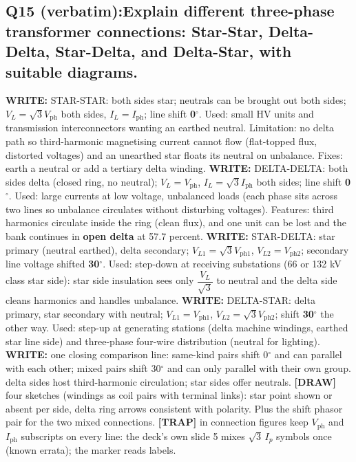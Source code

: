 \documentclass[11pt]{article}
\newcommand{\q}[2]{\subsection*{\color{copper}#1\quad\color{iron}#2}}
\newcommand{\w}[1]{\textbf{\color{copper}WRITE:} #1}
\newcommand{\tr}[1]{\textbf{\color{red}[TRAP]} #1}
\newcommand{\dw}[1]{\textbf{\color{muted}[DRAW]} #1}
\begin{document}
\q{Q15 (verbatim):}{Explain different three-phase transformer connections: Star-Star, Delta-Delta, Star-Delta, and Delta-Star, with suitable diagrams.}
\w{STAR-STAR:} both sides star; neutrals can be brought out both sides; $V_L = \sqrt{3} V_{\text{ph}}$ both sides, $I_L = I_{\text{ph}}$; line shift \textbf{0$^\circ$}. Used: small HV units and transmission interconnectors wanting an earthed neutral. Limitation: no delta path so third-harmonic magnetising current cannot flow (flat-topped flux, distorted voltages) and an unearthed star floats its neutral on unbalance. Fixes: earth a neutral or add a tertiary delta winding.
\w{DELTA-DELTA:} both sides delta (closed ring, no neutral); $V_L = V_{\text{ph}}$, $I_L = \sqrt{3} I_{\text{ph}}$ both sides; line shift \textbf{0$^\circ$}. Used: large currents at low voltage, unbalanced loads (each phase sits across two lines so unbalance circulates without disturbing voltages). Features: third harmonics circulate inside the ring (clean flux), and one unit can be lost and the bank continues in \textbf{open delta} at 57.7 percent.
\w{STAR-DELTA:} star primary (neutral earthed), delta secondary; $V_{L1} = \sqrt{3} V_{\text{ph1}}$, $V_{L2} = V_{\text{ph2}}$; secondary line voltage shifted \textbf{30$^\circ$}. Used: step-down at receiving substations (66 or 132 kV class star side): star side insulation sees only $\dfrac{V_L}{\sqrt{3}}$ to neutral and the delta side cleans harmonics and handles unbalance.
\w{DELTA-STAR:} delta primary, star secondary with neutral; $V_{L1} = V_{\text{ph1}}$, $V_{L2} = \sqrt{3} V_{\text{ph2}}$; shift \textbf{30$^\circ$} the other way. Used: step-up at generating stations (delta machine windings, earthed star line side) and three-phase four-wire distribution (neutral for lighting).
\w{one closing comparison line:} same-kind pairs shift 0$^\circ$ and can parallel with each other; mixed pairs shift 30$^\circ$ and can only parallel with their own group. delta sides host third-harmonic circulation; star sides offer neutrals.
\dw{four sketches (windings as coil pairs with terminal links): star point shown or absent per side, delta ring arrows consistent with polarity. Plus the shift phasor pair for the two mixed connections.}
\tr{in connection figures keep $V_{\text{ph}}$ and $I_{\text{ph}}$ subscripts on every line: the deck's own slide 5 mixes $\sqrt{3}\, I_p$ symbols once (known errata); the marker reads labels.}
\end{document}

